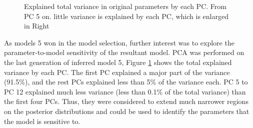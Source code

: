 \begin{figure}[H]
    \begin{center}
    \end{center}

    \caption[Explained total variance in original parameters by each PC]{Explained total variance in original parameters by each PC. From PC 5 on. little variance is explained by each PC, which is enlarged in Right}
    \label{fig:pc}
\end{figure}

As models 5 won in the model selection, further interest was to explore the parameter-to-model sensitivity of the resultant model. PCA was performed on the last generation of inferred model 5, Figure \ref{fig:pc} shows the total explained variance by each PC. The first PC explained a major part of the variance (91.5\%), and the rest PCs explained less than 5\% of the variance each. PC 5 to PC 12 explained much less variance (less than 0.1\% of the total variance) than the first four PCs. Thus, they were considered to extend much narrower regions on the posterior distributions and could be used to identify the parameters that the model is sensitive to.

